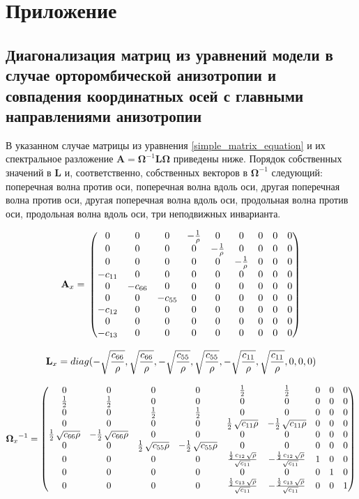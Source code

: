 \section{Приложение}
\subsection{Диагонализация матриц из уравнений модели в случае орторомбической анизотропии и совпадения координатных осей с главными направлениями анизотропии}
\label{application1}

В указанном случае матрицы из уравнения \eqref{simple_matrix_equation} и их спектральное разложение $\mathbf{A} = \mathbf{\Omega}^{-1} \mathbf{L} \mathbf{\Omega}$ приведены ниже. Порядок собственных значений в $\mathbf{L}$ и, соответственно, собственных векторов в $\mathbf{\Omega}^{-1}$ следующий: поперечная волна против оси, поперечная волна вдоль оси, другая поперечная волна против оси, другая поперечная волна вдоль оси, продольная волна против оси, продольная волна вдоль оси, три неподвижных инварианта.

\[\mathbf{A}_x = \\
\begin{pmatrix}0 & 0 & 0 & -\frac{1}{\rho} & 0 & 0 & 0 & 0 & 0\cr 0 & 0 & 0 & 0 & -\frac{1}{\rho} & 0 & 0 & 0 & 0\cr 0 & 0 & 0 & 0 & 0 & -\frac{1}{\rho} & 0 & 0 & 0\cr -c_{11} & 0 & 0 & 0 & 0 & 0 & 0 & 0 & 0\cr 0 & -c_{66} & 0 & 0 & 0 & 0 & 0 & 0 & 0\cr 0 & 0 & -c_{55} & 0 & 0 & 0 & 0 & 0 & 0\cr -c_{12} & 0 & 0 & 0 & 0 & 0 & 0 & 0 & 0\cr 0 & 0 & 0 & 0 & 0 & 0 & 0 & 0 & 0\cr -c_{13} & 0 & 0 & 0 & 0 & 0 & 0 & 0 & 0\end{pmatrix}\]

\[\mathbf{L}_x = \\
diag(-\sqrt{\frac{c_{66}}{\rho}},\sqrt{\frac{c_{66}}{\rho}},-\sqrt{\frac{c_{55}}{\rho}},\sqrt{\frac{c_{55}}{\rho}},-\sqrt{\frac{c_{11}}{\rho}},\sqrt{\frac{c_{11}}{\rho}},0,0,0)\]

\[{\mathbf{\Omega}_x}^{-1} = 
\begin{pmatrix}0 & 0 & 0 & 0 & \frac{1}{2} & \frac{1}{2} & 0 & 0 & 0\cr \frac{1}{2} & \frac{1}{2} & 0 & 0 & 0 & 0 & 0 & 0 & 0\cr 0 & 0 & \frac{1}{2} & \frac{1}{2} & 0 & 0 & 0 & 0 & 0\cr 0 & 0 & 0 & 0 & \frac{1}{2}\,\sqrt{c_{11} \rho} & -\frac{1}{2}\,\sqrt{c_{11} \rho} & 0 & 0 & 0\cr \frac{1}{2}\,\sqrt{c_{66} \rho} & -\frac{1}{2}\,\sqrt{c_{66} \rho} & 0 & 0 & 0 & 0 & 0 & 0 & 0\cr 0 & 0 & \frac{1}{2}\,\sqrt{c_{55} \rho} & -\frac{1}{2}\,\sqrt{c_{55} \rho} & 0 & 0 & 0 & 0 & 0\cr 0 & 0 & 0 & 0 & \frac{\frac{1}{2}\,c_{12}\,\sqrt{\rho}}{\sqrt{c_{11}}} & -\frac{\frac{1}{2}\,c_{12}\,\sqrt{\rho}}{\sqrt{c_{11}}} & 1 & 0 & 0\cr 0 & 0 & 0 & 0 & 0 & 0 & 0 & 1 & 0\cr 0 & 0 & 0 & 0 & \frac{\frac{1}{2}\,c_{13}\,\sqrt{\rho}}{\sqrt{c_{11}}} & -\frac{\frac{1}{2}\,c_{13}\,\sqrt{\rho}}{\sqrt{c_{11}}} & 0 & 0 & 1\end{pmatrix}\]

